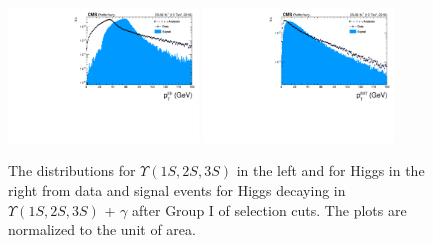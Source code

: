 \begin{figure}[!htbp]
\begin{center}
\includegraphics[width=0.45\textwidth]{figures/outputPlots/HtoUpsilon_Cat0_ZZZZZ/au/data_x_mc/noKinCuts/h_noKin_Upsilon_Pt}\hspace*{1.cm}
\includegraphics[width=0.45\textwidth]{figures/outputPlots/HtoUpsilon_Cat0_ZZZZZ/au/data_x_mc/noKinCuts/h_noKin_Z_Pt}
\end{center}\vspace*{-.5cm}
\caption{The \PT distributions for $\Upsilon(1S,2S,3S)$ in the left and for Higgs in the right from data and signal events for Higgs decaying in $\Upsilon(1S,2S,3S)$ + $\gamma$ after Group I of selection cuts. The plots are normalized to the unit of area.}
\label{fig:pTUpsilon_and_Higgs_HtoUpsilon_Cat0}
\end{figure}


